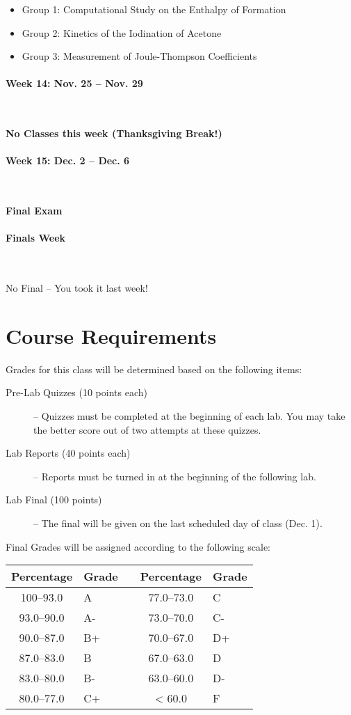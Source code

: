 \documentclass[12pt, letterpaper]{article}
\begin{document}
\begin{itemize}
  \item Group 1: Computational Study on the Enthalpy of Formation
  \item Group 2: Kinetics of the Iodination of Acetone
  \item Group 3: Measurement of Joule-Thompson Coefficients
\end{itemize}

\paragraph{Week 14: Nov. 25 -- Nov. 29}~

\textbf{No Classes this week (Thanksgiving Break!)}


\paragraph{Week 15: Dec. 2 -- Dec. 6}~

\textbf{Final Exam}

\paragraph{Finals Week}~

No Final -- You took it last week!

\section*{Course Requirements}
Grades for this class will be determined based on the following items:

\begin{description}
	\item[Pre-Lab Quizzes (10 points each)] -- Quizzes must be completed at the beginning of each lab. You may take the better score out of two attempts at these quizzes.
	\item[Lab Reports (40 points each)] -- Reports must be turned in at the beginning of the following lab.
	\item[Lab Final (100 points)] -- The final will be given on the last scheduled day of class (Dec. 1).
\end{description}

\noindent Final Grades will be assigned according to the following scale:

\begin{tabular}{cl|c|cl}
	Percentage & Grade &  & Percentage & Grade \\ \midrule
	100--93.0  & A     &  & 77.0--73.0 & C     \\
	93.0--90.0 & A-    &  & 73.0--70.0 & C-    \\
	90.0--87.0 & B+    &  & 70.0--67.0 & D+    \\
	87.0--83.0 & B     &  & 67.0--63.0 & D     \\
	83.0--80.0 & B-    &  & 63.0--60.0 & D-    \\
	80.0--77.0 & C+    &  & < 60.0     & F
\end{tabular}
\end{document}
